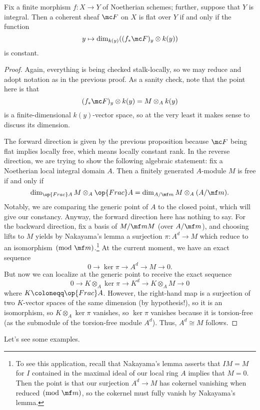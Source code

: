 \documentclass[../notes.tex]{subfiles}
\begin{document}
\begin{proposition}
	Fix a finite morphism $f\colon X\to Y$ of Noetherian schemes; further, suppose that $Y$ is integral. Then a coherent sheaf $\mc F$ on $X$ is flat over $Y$ if and only if the function
	\[y\mapsto\dim_{k(y)}((f_*\mc F)_y\otimes k(y))\]
	is constant.
\end{proposition}
\begin{proof}
	Again, everything is being checked stalk-locally, so we may reduce and adopt notation as in the previous proof. As a sanity check, note that the point here is that
	\[(f_*\mc F)_y\otimes k(y)=M\otimes_Ak(y)\]
	is a finite-dimensional $k(y)$-vector space, so at the very least it makes sense to discuss its dimension.

	The forward direction is given by the previous proposition because $\mc F$ being flat implies locally free, which means locally constant rank. In the reverse direction, we are trying to show the following algebraic statement: fix a Noetherian local integral domain $A$. Then a finitely generated $A$-module $M$ is free if and only if
	\[\dim_{\op{Frac}A}M\otimes_A\op{Frac}A=\dim_{A/\mf m}M\otimes_A(A/\mf m).\]
	Notably, we are comparing the generic point of $A$ to the closed point, which will give our constancy. Anyway, the forward direction here has nothing to say. For the backward direction, fix a basis of $M/\mf mM$ (over $A/\mf m$), and choosing lifts to $M$ yields by Nakayama's lemma a surjection $\pi\colon A^d\to M$ which reduce to an isomorphism$\pmod{\mf m}$.\footnote{To see this application, recall that Nakayama's lemma asserts that $IM=M$ for $I$ contained in the maximal ideal of our local ring $A$ implies that $M=0$. Then the point is that our surjection $A^d\to M$ has cokernel vanishing when reduced$\pmod{\mf m}$, so the cokernel must fully vanish by Nakayama's lemma.} At the current moment, we have an exact sequence
	\[0\to\ker\pi\to A^d\to M\to0.\]
	But now we can localize at the generic point to receive the exact sequence
	\[0\to K\otimes_A\ker\pi\to K^d\to K\otimes_AM\to0\]
	where $K\coloneqq\op{Frac}A$. However, the right-hand map is a surjection of two $K$-vector spaces of the same dimension (by hypothesis!), so it is an isomorphism, so $K\otimes_A\ker\pi$ vanishes, so $\ker\pi$ vanishes because it is torsion-free (as the submodule of the torsion-free module $A^d$). Thus, $A^d\cong M$ follows.
\end{proof}
Let's see some examples.
\end{document}
